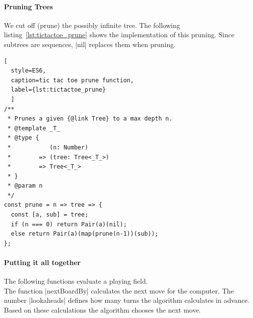 \paragraph{Pruning Trees} 
We cut off (prune) the possibly infinite tree. The following
listing~\ref{lst:tictactoe_prune} shows the implementation of this pruning.
Since subtrees are sequences, |nil| replaces them when pruning.

\begin{lstlisting}[
  style=ES6, 
  caption=tic tac toe prune function,
  label={lst:tictactoe_prune}
  ]
/**
 * Prunes a given {@link Tree} to a max depth n.
 * @template _T_
 * @type {
 *           (n: Number)
 *        => (tree: Tree<_T_>)
 *        => Tree<_T_>
 * }
 * @param n
 */
const prune = n => tree => {
  const [a, sub] = tree;
  if (n === 0) return Pair(a)(nil);
  else return Pair(a)(map(prune(n-1))(sub));
};
\end{lstlisting}

\paragraph{Putting it all together}
The following functions evaluate a playing field. \\ 
The function |nextBoardBy| calculates the next move for the computer. The
number |lookaheads| defines how many turns the algorithm calculates in advance.
Based on these calculations the algorithm chooses the next move.

